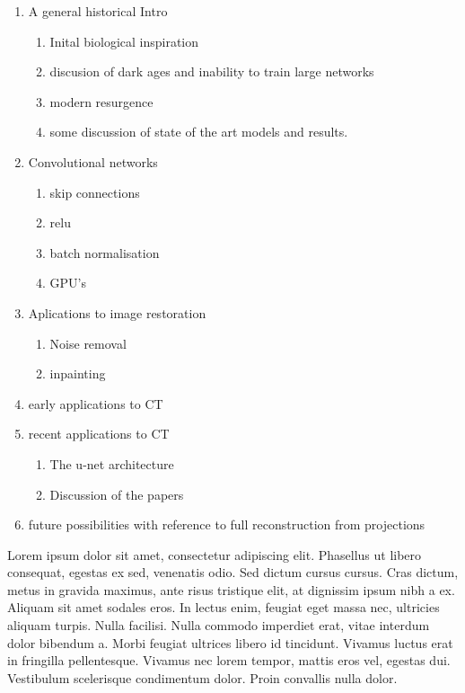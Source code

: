 \begin{enumerate}
\item A general historical Intro
\begin{enumerate}
    \item Inital biological inspiration
    \item discusion of dark ages and inability to train large networks
    \item modern resurgence
    \item some discussion of state of the art models and results. 
\end{enumerate}
\item Convolutional networks
\begin{enumerate}
    \item skip connections
    \item relu
    \item batch normalisation
    \item GPU's
\end{enumerate}
\item Aplications to image restoration
\begin{enumerate}
    \item Noise removal 
    \item inpainting
\end{enumerate}
\item early applications to CT
\item recent applications to CT
\begin{enumerate}
    \item The u-net architecture
    \item Discussion of the papers
\end{enumerate}
\item future possibilities with reference to full reconstruction from projections
\end{enumerate}




Lorem ipsum dolor sit amet, consectetur adipiscing elit. Phasellus ut libero consequat, egestas ex sed, venenatis odio. Sed dictum cursus cursus. Cras dictum, metus in gravida maximus, ante risus tristique elit, at dignissim ipsum nibh a ex. Aliquam sit amet sodales eros. In lectus enim, feugiat eget massa nec, ultricies aliquam turpis. Nulla facilisi. Nulla commodo imperdiet erat, vitae interdum dolor bibendum a. Morbi feugiat ultrices libero id tincidunt. Vivamus luctus erat in fringilla pellentesque. Vivamus nec lorem tempor, mattis eros vel, egestas dui. Vestibulum scelerisque condimentum dolor. Proin convallis nulla dolor.

